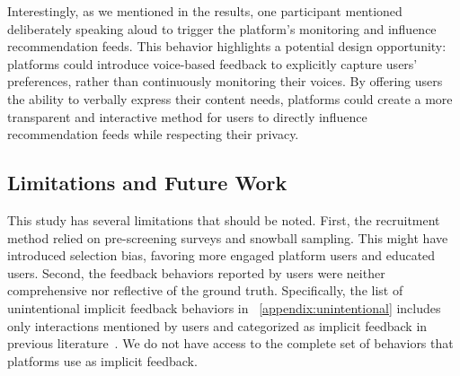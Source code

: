 Interestingly, as we mentioned in the results, one participant mentioned deliberately speaking aloud to trigger the platform's monitoring and influence recommendation feeds. This behavior highlights a potential design opportunity: platforms could introduce voice-based feedback to explicitly capture users' preferences, rather than continuously monitoring their voices. By offering users the ability to verbally express their content needs, platforms could create a more transparent and interactive method for users to directly influence recommendation feeds while respecting their privacy.


\subsection{Limitations and Future Work}
This study has several limitations that should be noted. First, the recruitment method relied on pre-screening surveys and snowball sampling. This might have introduced selection bias, favoring more engaged platform users and educated users. Second, the feedback behaviors reported by users were neither comprehensive nor reflective of the ground truth. Specifically, the list of unintentional implicit feedback behaviors in ~\autoref{appendix:unintentional} includes only interactions mentioned by users and categorized as implicit feedback in previous literature~\cite{jannach2018recommending}. We do not have access to the complete set of behaviors that platforms use as implicit feedback. 

